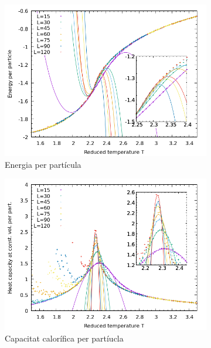 \documentclass[a4paper]{article}
\begin{document}
\begin{figure}[H]
    \centering
    \begin{subfigure}{.45\textwidth}
        \centering
        \includegraphics[width=\textwidth]{plot-e-fit.png}
        \caption{Energia per partícula}
        \label{fig:fit-e}
    \end{subfigure}
    \begin{subfigure}{.45\textwidth}
        \centering
        \includegraphics[width=\textwidth]{plot-cv-fit.png}
        \caption{Capacitat calorífica per partíucla}
        \label{fig:fit-cv}
    \end{subfigure}
        \begin{subfigure}{.45\textwidth}
        \centering

\end{subfigure}
\end{figure}
\end{document}
